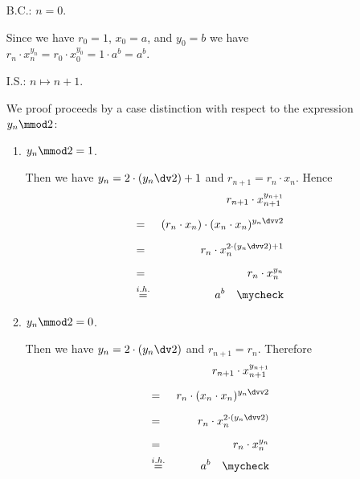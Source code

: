 \begin{enumerate}
\item[B.C.:] $n=0$.

            Since we have $r_0 = 1$, $x_0 = a$, and $y_0 = b$ we have 
            \\[0.2cm]
            \hspace*{1.3cm}
            $r_n \cdot x_n^{y_n} = r_0 \cdot x_0^{y_0} = 1 \cdot a^{b} = a^b$. \mycheck
\item[I.S.:] $n \mapsto n + 1$.

            We proof proceeds by a case distinction with respect to the expression $y_n \mmod 2$:
            \begin{enumerate}
            \item $y_n \mmod 2 = 1$.

                  Then we have $y_{n} = 2 \cdot (y_n\dv 2) + 1$ and
                  $r_{n+1} = r_n \cdot x_n$.  Hence
                  \begin{eqnarray*}
                      &   & r_{n+1} \cdot x_{n+1}^{y_{n+1}} \\[0.2cm] 
                      & = & (r_{n} \cdot x_n) \cdot (x_{n} \cdot x_{n})^{y_{n}\dvv 2} \\[0.2cm] 
                      & = & r_{n} \cdot x_n^{2 \cdot (y_{n}\dvv 2) + 1} \\[0.2cm] 
                      & = & r_{n} \cdot x_n^{y_n} \\
                      & \stackrel{i.h.}{=} & a^{b} \quad \text{\mycheck}
                  \end{eqnarray*}

            \item $y_n \mmod 2 = 0$.

                  Then we have $y_{n} = 2 \cdot (y_n\dv 2)$ and $r_{n+1} = r_n$.
                  Therefore
                  \begin{eqnarray*}
                      &   & r_{n+1} \cdot x_{n+1}^{y_{n+1}} \\[0.2cm] 
                      & = & r_{n} \cdot (x_{n} \cdot x_{n})^{y_{n}\dvv 2} \\[0.2cm] 
                      & = & r_{n} \cdot x_n^{2 \cdot (y_{n} \dvv 2)} \\[0.2cm] 
                      & = & r_{n} \cdot x_n^{y_n} \\
                      & \stackrel{i.h.}{=} & a^{b} \quad \text{\mycheck}
                  \end{eqnarray*}
            \end{enumerate}
\end{enumerate}
